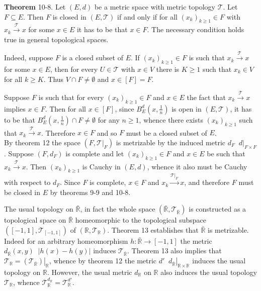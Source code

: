 \documentclass[a4paper]{article}
\newcommand{\clo}[1]{\left [ #1 \right ]}
\newcommand{\brac}[1]{\left ( #1 \right )}
\newcommand{\induc}[1]{\left . #1 \right \vert}
\newcommand{\abs}[1]{\left | #1 \right |}
\newcommand{\Rbar}{{\bar{\mathbb{R}}}}
\newcommand{\Real}{\mathbb{R}}
\newcommand{\Tcal}{\mathcal{T}}
\newcommand{\defn}{\mathop{\overset{\Delta}{=}}\nolimits}
\begin{document}
\label{thm:metric_closed_sequence} \noindent \textbf{Theorem} 10-8.
Let $\brac{E, d}$ be a metric space with metric topology $\Tcal$. Let $F\subseteq E$. Then $F$ is closed in $\brac{E, \Tcal}$ if and only if for all $\brac{x_k}_{k\geq 1}\in F$ with $x_k\overset{\Tcal}{\to}x$ for some $x\in E$ it has to be that $x\in F$. The necessary condition holds true in general topological spaces.

Indeed, suppose $F$ is a closed subset of $E$. If $\brac{x_k}_{k\geq 1}\in F$ is such that $x_k\overset{\Tcal}{\to}x$ for some $x\in E$, then for every $U\in \Tcal$ with $x\in V$ there is $K\geq 1$ such that $x_k\in V$ for all $k\geq K$. Thus $V\cap F\neq \emptyset$ and $x\in \clo{F} = F$.

Suppose $F$ is such that for every $\brac{x_k}_{k\geq 1}\in F$ and $x\in E$ the fact that $x_k\overset{\Tcal}{\to}x$ implies $x\in F$. Then for all $x\in \clo{F}$, since $B_E^d\brac{x,\frac{1}{n}}$ is open in $\brac{E,\Tcal}$, it has to be that $B_E^d\brac{x,\frac{1}{n}}\cap F \neq \emptyset$ for any $n\geq 1$, whence there exists $\brac{x_k}_{k\geq 1}$ such that $x_k\overset{\Tcal}{\to} x$. Therefore $x\in F$ and so $F$ must be a closed subset of $E$.\\

By theorem 12 the space $\brac{F,\induc{\Tcal}_F}$ is metrizable by the induced metric $d_F\defn \induc{d}_{F\times F}$. Suppose $\brac{F, d_F}$ is complete and let $\brac{x_k}_{k\geq 1}\in F$ and $x\in E$ be such that $x_k\overset{\Tcal}{\to}x$. Then $\brac{x_k}_{k\geq 1}$ is Cauchy in $\brac{E, d}$, whence it also must be Cauchy with respect to $d_F$. Since $F$ is complete, $x\in F$ and $x_k\overset{\induc{\Tcal}_F}{\to}x$, and therefore $F$ must be closed in $E$ by theorems 9-9 and 10-8.

The usual topology on $\Rbar$, in fact the whole space $\brac{\Rbar,\Tcal_\Rbar}$ is constructed as a topological space on $\Rbar$ homeomorphic to the topological subspace $\brac{\clo{-1,1},\Tcal_{\clo{-1,1}}}$ of $\brac{\Real, \Tcal_\Real}$. Theorem 13 establishes that $\Rbar$ is metrizable. Indeed for  an arbitrary homeomorphism $h:\Rbar\to \clo{-1,1}$ the metric $d_\Rbar\brac{x,y}\defn \abs{h\brac{x}-h\brac{y}}$ induces $\Tcal_\Rbar$. Theorem 13 also implies that $\Tcal_\Real = \induc{\brac{\Tcal_\Rbar}}_{\Real}$, whence by theorem 12 the metric $d'\defn \induc{d_\Rbar}_{\Real\times \Real}$ induces the usual topology on $\Real$. However, the usual metric $d_\Real$ on $\Real$ also induces the usual topology $\Tcal_\Real$, whence $\Tcal_\Real^{d_\Real} = \Tcal_\Real^{d'}$.
\end{document}
